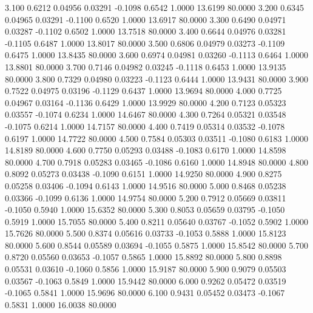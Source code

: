    3.100   0.6212   0.04956   0.03291  -0.1098   0.6542   1.0000  13.6199  80.0000
   3.200   0.6345   0.04965   0.03291  -0.1100   0.6520   1.0000  13.6917  80.0000
   3.300   0.6490   0.04971   0.03287  -0.1102   0.6502   1.0000  13.7518  80.0000
   3.400   0.6644   0.04976   0.03281  -0.1105   0.6487   1.0000  13.8017  80.0000
   3.500   0.6806   0.04979   0.03273  -0.1109   0.6475   1.0000  13.8435  80.0000
   3.600   0.6974   0.04981   0.03260  -0.1113   0.6464   1.0000  13.8801  80.0000
   3.700   0.7146   0.04982   0.03245  -0.1118   0.6453   1.0000  13.9135  80.0000
   3.800   0.7329   0.04980   0.03223  -0.1123   0.6444   1.0000  13.9431  80.0000
   3.900   0.7522   0.04975   0.03196  -0.1129   0.6437   1.0000  13.9694  80.0000
   4.000   0.7725   0.04967   0.03164  -0.1136   0.6429   1.0000  13.9929  80.0000
   4.200   0.7123   0.05323   0.03557  -0.1074   0.6234   1.0000  14.6467  80.0000
   4.300   0.7264   0.05321   0.03548  -0.1075   0.6214   1.0000  14.7157  80.0000
   4.400   0.7419   0.05314   0.03532  -0.1078   0.6197   1.0000  14.7722  80.0000
   4.500   0.7584   0.05303   0.03511  -0.1080   0.6183   1.0000  14.8189  80.0000
   4.600   0.7750   0.05293   0.03488  -0.1083   0.6170   1.0000  14.8598  80.0000
   4.700   0.7918   0.05283   0.03465  -0.1086   0.6160   1.0000  14.8948  80.0000
   4.800   0.8092   0.05273   0.03438  -0.1090   0.6151   1.0000  14.9250  80.0000
   4.900   0.8275   0.05258   0.03406  -0.1094   0.6143   1.0000  14.9516  80.0000
   5.000   0.8468   0.05238   0.03366  -0.1099   0.6136   1.0000  14.9754  80.0000
   5.200   0.7912   0.05669   0.03811  -0.1050   0.5940   1.0000  15.6352  80.0000
   5.300   0.8053   0.05659   0.03795  -0.1050   0.5919   1.0000  15.7055  80.0000
   5.400   0.8211   0.05640   0.03767  -0.1052   0.5902   1.0000  15.7626  80.0000
   5.500   0.8374   0.05616   0.03733  -0.1053   0.5888   1.0000  15.8123  80.0000
   5.600   0.8544   0.05589   0.03694  -0.1055   0.5875   1.0000  15.8542  80.0000
   5.700   0.8720   0.05560   0.03653  -0.1057   0.5865   1.0000  15.8892  80.0000
   5.800   0.8898   0.05531   0.03610  -0.1060   0.5856   1.0000  15.9187  80.0000
   5.900   0.9079   0.05503   0.03567  -0.1063   0.5849   1.0000  15.9442  80.0000
   6.000   0.9262   0.05472   0.03519  -0.1065   0.5841   1.0000  15.9696  80.0000
   6.100   0.9431   0.05452   0.03473  -0.1067   0.5831   1.0000  16.0038  80.0000
